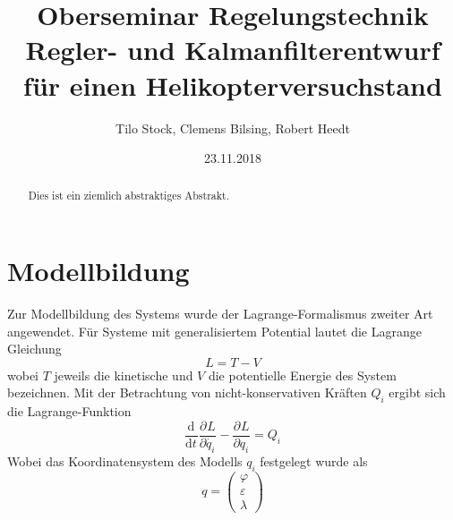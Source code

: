 \documentclass[times, 10pt,twocolumn]{article}
\newcommand{\partiell}[3][]{\frac{\partial^{#1}#2}{\partial{#3}^{#1}}}
\newcommand{\diff}[3][]{\frac{\mathrm{d}^{#1}#2}{\mathrm{d}{#3}^{#1}}}
\begin{document}
	\title{Oberseminar Regelungstechnik \\ Regler- und Kalmanfilterentwurf f\"ur einen 					Helikopterversuchstand}
	\author{Tilo Stock, Clemens Bilsing, Robert Heedt}
	\date {23.11.2018}

	\maketitle
	\thispagestyle{empty}
	
	\renewcommand\abstractname{Zusammenfassung}
\begin{abstract}
	Dies ist ein ziemlich abstraktiges Abstrakt.
\end{abstract}		
	
	\section{Modellbildung}
	Zur Modellbildung des Systems wurde der Lagrange-Formalismus zweiter Art angewendet. Für Systeme mit generalisiertem Potential lautet die Lagrange Gleichung 
	\begin{equation}
	L = T -V
	\end{equation}
	wobei $T$ jeweils die kinetische und $V$ die potentielle Energie des System bezeichnen.
	Mit der Betrachtung von nicht-konservativen Kräften $Q_i$ ergibt sich die Lagrange-Funktion
	\begin{equation}\label{eq:lagrange}
	\diff{}{t} \partiell{L}{\dot{q_i}} - \partiell{L}{q_i}=Q_i
	\end{equation}
	Wobei das Koordinatensystem des Modells $q_i$ festgelegt wurde als
	\begin{equation}
	q = \begin{pmatrix}
	\varphi\\\varepsilon\\\lambda
	\end{pmatrix}
	\end{equation}
\end{document}

